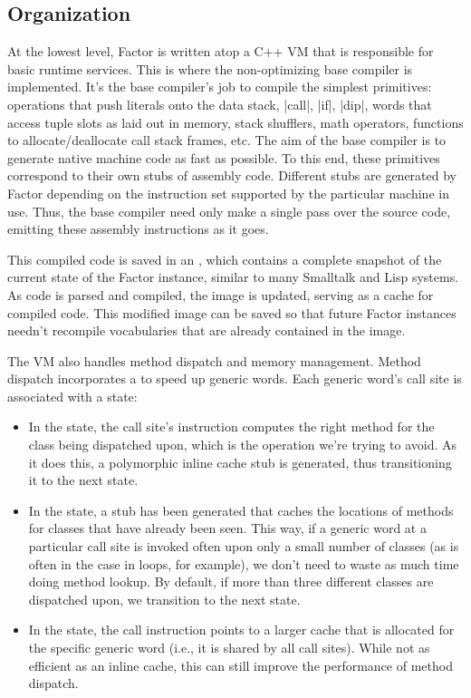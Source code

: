 \subsection{Organization}\label{sec:compiler:vm}

At the lowest level, Factor is written atop a C++ \gls{VM} that is responsible
for basic runtime services.  This is where the non-optimizing base compiler is
implemented.  It's the base compiler's job to compile the simplest primitives:
operations that push literals onto the data stack, \factor|call|, \factor|if|,
\factor|dip|, words that access tuple slots as laid out in memory, stack
shufflers, math operators, functions to allocate/deallocate call stack frames,
etc.  The aim of the base compiler is to generate native machine code as fast
as possible.  To this end, these primitives correspond to their own stubs of
assembly code.  Different stubs are generated by Factor depending on the
instruction set supported by the particular machine in use.  Thus, the base
compiler need only make a single pass over the source code, emitting these
assembly instructions as it goes.

This compiled code is saved in an , which contains a complete
snapshot of the current state of the Factor instance, similar to many Smalltalk
and Lisp systems.  As code is parsed and compiled, the image is
updated, serving as a cache for compiled code.  This modified image can be
saved so that future Factor instances needn't recompile vocabularies that are
already contained in the image.

The \gls{VM} also handles method dispatch and memory management.  Method
dispatch incorporates a  to speed up generic
words.  Each generic word's call site is associated with a state:
\begin{itemize}
  \item In the  state, the call site's instruction computes the
        right method for the class being dispatched upon, which is the
        operation we're trying to avoid.  As it does this, a polymorphic inline
        cache stub is generated, thus transitioning it to the next state.
  \item In the  state, a stub has been generated that caches
        the locations of methods for classes that have already been seen.  This
        way, if a generic word at a particular call site is invoked often upon
        only a small number of classes (as is often in the case in loops, for
        example), we don't need to waste as much time doing method lookup.  By
        default, if more than three different classes are dispatched upon, we
        transition to the next state.
  \item In the  state, the call instruction points to a
        larger cache that is allocated for the specific generic word (i.e., it
        is shared by all call sites).  While not as efficient as an inline
        cache, this can still improve the performance of method dispatch.
\end{itemize}

